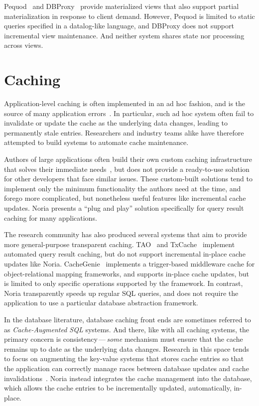 Pequod~\cite{pequod} and DBProxy~\cite{dbproxy} provide materialized views that
also support partial materialization in response to client demand. However,
Pequod is limited to static queries specified in a datalog-like language, and
DBProxy does not support incremental view maintenance. And neither system shares
state nor processing across views.

\section{Caching}

Application-level caching is often implemented in an ad hoc fashion, and is the
source of many application errors~\cite{ad-hoc-caching}. In particular, such ad
hoc system often fail to invalidate or update the cache as the underlying data
changes, leading to permanently stale entries. Researchers and industry teams
alike have therefore attempted to build systems to automate cache maintenance.

Authors of large applications often build their own custom caching
infrastructure that solves their immediate needs~\cite{facebook-memcache,
flannel}, but does not provide a ready-to-use solution for other developers that
face similar issues. These custom-built solutions tend to implement only the
minimum functionality the authors need at the time, and forego more complicated,
but nonetheless useful features like incremental cache updates. Noria presents a
``plug and play'' solution specifically for query result caching for many
applications.

The research community has also produced several systems that aim to provide
more general-purpose transparent caching. TAO~\cite{tao} and
TxCache~\cite{txcache} implement automated query result caching, but do not
support incremental in-place cache updates like Noria.
CacheGenie~\cite{cachegenie} implements a trigger-based middleware cache for
object-relational mapping frameworks, and supports in-place cache updates, but
is limited to only specific operations supported by the framework. In contrast,
Noria transparently speeds up regular SQL queries, and does not require the
application to use a particular database abstraction framework.

In the database literature, database caching front ends are sometimes referred
to as \textit{Cache-Augmented SQL} systems. And there, like with all caching
systems, the primary concern is consistency\,---\,\emph{some} mechanism must
ensure that the cache remains up to date as the underlying data changes.
Research in this space tends to focus on augmenting the key-value systems that
stores cache entries so that the application can correctly manage races between
database updates and cache invalidations~\cite{facebook-memcache,
casql-consistency, casql-consistency-thesis}. Noria instead integrates the cache
management into the database, which allows the cache entries to be incrementally
updated, automatically, in-place.

